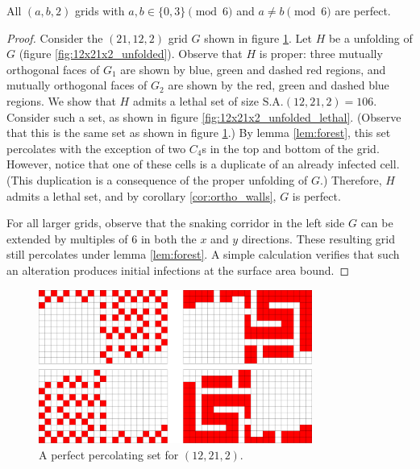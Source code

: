 
\begin{con}
All $(a,b,2)$ grids with $a,b \in \{0,3\} \pmod 6$ and $a \neq b \pmod 6$ are perfect. 
\end{con}

\begin{proof}
Consider the $(21,12,2)$ grid $G$ shown in figure \ref{fig:12x21x2}. Let $H$ be a unfolding of $G$ (figure \ref{fig:12x21x2_unfolded}). Observe that $H$ is proper: three mutually orthogonal faces of $G_1$ are shown by blue, green and dashed red regions, and mutually orthogonal faces of $G_2$ are shown by the red, green and dashed blue regions. We show that $H$ admits a lethal set of size $\text{S.A.}(12,21,2) = 106$. Consider such a set, as shown in figure \ref{fig:12x21x2_unfolded_lethal}. (Observe that this is the same set as shown in figure \ref{fig:12x21x2}.) By lemma \ref{lem:forest}, this set percolates with the exception of two $C_4$s in the top and bottom of the grid. However, notice that one of these cells is a duplicate of an already infected cell. (This duplication is a consequence of the proper unfolding of $G$.) Therefore, $H$ admits a lethal set, and by corollary \ref{cor:ortho_walls}, $G$ is perfect.

For all larger grids, observe that the snaking corridor in the left side $G$ can be extended by multiples of 6 in both the $x$ and $y$ directions. These resulting grid still percolates under lemma \ref{lem:forest}. A simple calculation verifies that such an alteration produces initial infections at the surface area bound. 
\end{proof}

\begin{figure}[]
\centering
\includegraphics[width=0.8\textwidth]{figures/7/12x21x2.pdf}
\caption{A perfect percolating set for $(12,21,2)$.}
\label{fig:12x21x2}
\end{figure} 

